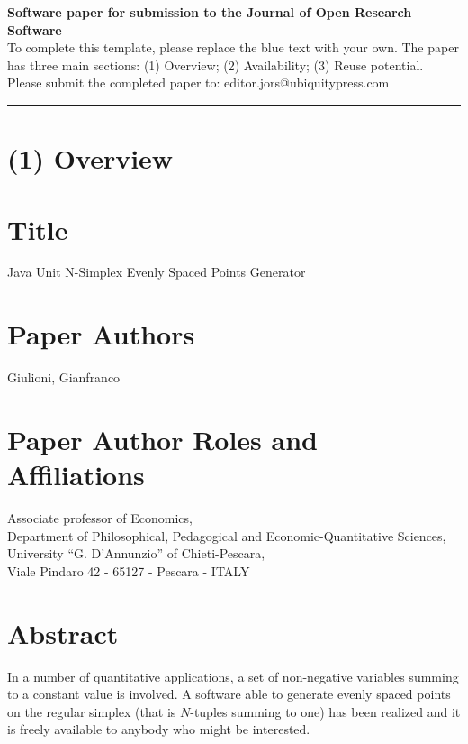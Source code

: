 \documentclass{jors}
\begin{document}
{\bf Software paper for submission to the Journal of Open Research Software} \\

To complete this template, please replace the blue text with your own. The paper has three main sections: (1) Overview; (2) Availability; (3) Reuse potential. \\

Please submit the completed paper to: editor.jors@ubiquitypress.com

\rule{\textwidth}{1pt}

\section*{(1) Overview}

\vspace{0.5cm}

\section*{Title}

Java Unit N-Simplex Evenly Spaced Points Generator
\section*{Paper Authors}

Giulioni, Gianfranco

\section*{Paper Author Roles and Affiliations}
Associate professor of Economics,\\ Department of Philosophical, Pedagogical and  
Economic-Quantitative Sciences,\\ University ``G. D'Annunzio'' of Chieti-Pescara,\\ 
Viale Pindaro 42 - 65127 - Pescara - ITALY

\section*{Abstract}

In a number of quantitative applications, a set of non-negative variables summing to a constant value is involved. 
A software able to generate evenly spaced points on the regular simplex (that is $N$-tuples summing to one) has been realized and it is freely available to anybody who might be interested.
\end{document}
